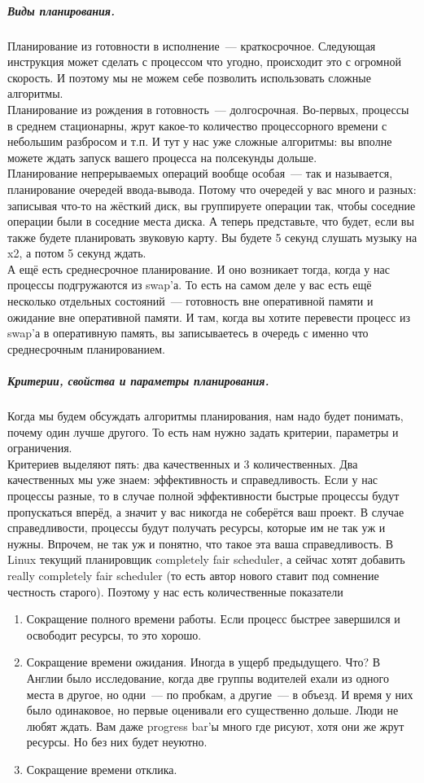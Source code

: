\documentclass{article}
\begin{document}
    \subparagraph{Виды планирования.}
    Планирование из готовности в исполнение~--- краткосрочное. Следующая инструкция может сделать с процессом что угодно, происходит это с огромной скорость. И поэтому мы не можем себе позволить использовать сложные алгоритмы.\\
    Планирование из рождения в готовность~--- долгосрочная. Во-первых, процессы в среднем стационарны, жрут какое-то количество процессорного времени с небольшим разбросом и т.п. И тут у нас уже сложные алгоритмы: вы вполне можете ждать запуск вашего процесса на полсекунды дольше.\\
    Планирование непрерываемых операций вообще особая~--- так и называется, планирование очередей ввода-вывода. Потому что очередей у вас много и разных: записывая что-то на жёсткий диск, вы группируете операции так, чтобы соседние операции были в соседние места диска. А теперь представьте, что будет, если вы также будете планировать звуковую карту. Вы будете 5 секунд слушать музыку на x2, а потом 5 секунд ждать.\\
    А ещё есть среднесрочное планирование. И оно возникает тогда, когда у нас процессы подгружаются из swap'а. То есть на самом деле у вас есть ещё несколько отдельных состояний~--- готовность вне оперативной памяти и ожидание вне оперативной памяти. И там, когда вы хотите перевести процесс из swap'а в оперативную память, вы записываетесь в очередь с именно что среднесрочным планированием.
    \subparagraph{Критерии, свойства и параметры планирования.}
    Когда мы будем обсуждать алгоритмы планирования, нам надо будет понимать, почему один лучше другого. То есть нам нужно задать критерии, параметры и ограничения.\\
    Критериев выделяют пять: два качественных и 3 количественных. Два качественных мы уже знаем: эффективность и справедливость. Если у нас процессы разные, то в случае полной эффективности быстрые процессы будут пропускаться вперёд, а значит у вас никогда не соберётся ваш проект. В случае справедливости, процессы будут получать ресурсы, которые им не так уж и нужны. Впрочем, не так уж и понятно, что такое эта ваша справедливость. В Linux текущий планировщик completely fair scheduler, а сейчас хотят добавить really completely fair scheduler (то есть автор нового ставит под сомнение честность старого). Поэтому у нас есть количественные показатели
    \begin{enumerate}
        \item Сокращение полного времени работы. Если процесс быстрее завершился и освободит ресурсы, то это хорошо.
        \item Сокращение времени ожидания. Иногда в ущерб предыдущего. Что? В Англии было исследование, когда две группы водителей ехали из одного места в другое, но одни~--- по пробкам, а другие~--- в объезд. И время у них было одинаковое, но первые оценивали его существенно дольше. Люди не любят ждать. Вам даже progress bar'ы много где рисуют, хотя они же жрут ресурсы. Но без них будет неуютно.
        \item Сокращение времени отклика.
    \end{enumerate}
\end{document}
